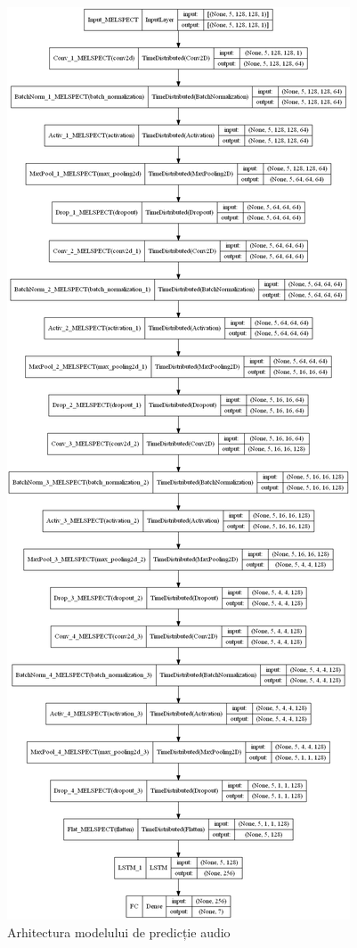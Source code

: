 \documentclass[a4paper, 12pt]{report}
\begin{document}
	\begin{figure}[H]
		\begin{center}
			\includegraphics[scale=0.2]{images/audio_model.png}
		\end{center}
		\caption{Arhitectura modelului de predicție audio}
		\label{fig:audio_model}
	\end{figure}
	
\end{document}
